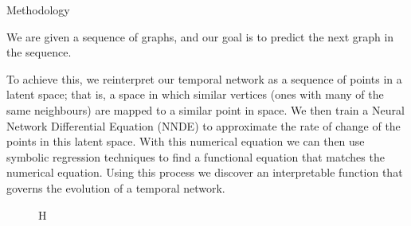 \documentclass[12pt]{amsbook}
\begin{document}
\begin{chapter}{Methodology}

        We are given a sequence of graphs, and our goal is to predict the next graph in the sequence. 
        
        To achieve this, we reinterpret our temporal network as a sequence of points in a latent space; that is, a space in which similar vertices (ones with many of the same neighbours) are mapped to a similar point in space.
        We then train a Neural Network Differential Equation (NNDE) to approximate the rate of change of the points in this latent space. With this numerical equation we can then use symbolic regression techniques to find a functional equation that matches the numerical equation. Using this process we discover an interpretable function that governs the evolution of a temporal network.

        \begin{figure}{H}
            \centering


\end{figure}
\end{chapter}
\end{document}
